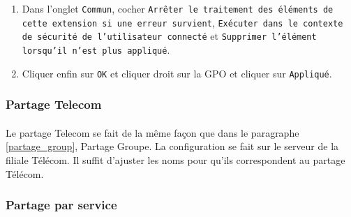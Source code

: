 \begin{enumerate}
						\item Dans l'onglet \texttt{Commun}, cocher \texttt{Arrêter le traitement des éléments de cette extension si une erreur survient}, \texttt{Exécuter dans le contexte de sécurité de l'utilisateur connecté} et \texttt{Supprimer l'élément lorsqu'il n'est plus appliqué}.
						\item Cliquer enfin sur \texttt{OK} et cliquer droit sur la GPO et cliquer sur \texttt{Appliqué}.
				\end{enumerate}
		\subsubsection{Partage Telecom}
			\paragraph{}
				Le partage Telecom se fait de la même façon que dans le paragraphe \ref{partage_group}, Partage Groupe. La configuration se fait sur le serveur de la filiale Télécom. Il suffit d'ajuster les noms pour qu'ils correspondent au partage Télécom. 
		\subsubsection{Partage par service}
